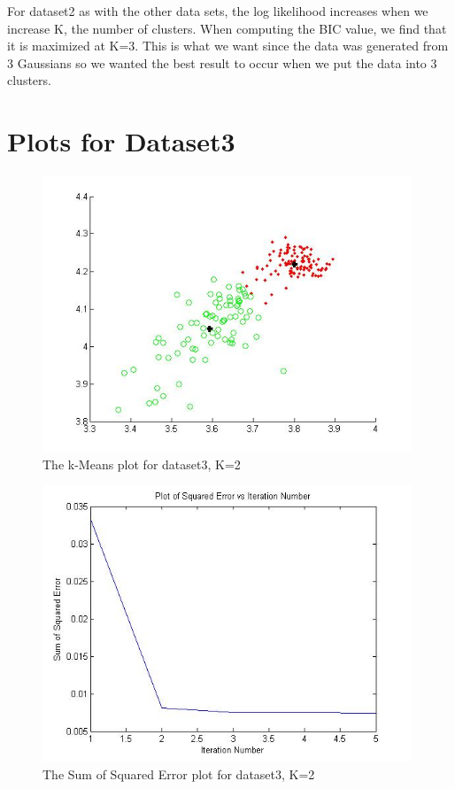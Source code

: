 \documentclass[11pt,psfig]{article}
\begin{document}
For dataset2 as with the other data sets, the log likelihood increases when we increase K, the number of clusters. When computing the BIC value, we find that it is maximized at K=3. This is what we want since the data was generated from 3 Gaussians so we wanted the best result to occur when we put the data into 3 clusters. 

\section{Plots for Dataset3}

\begin{figure}[H]
\centering
\includegraphics[height=3.25in]{dataset3_kMeansPlot.jpg}
\caption{The k-Means plot for dataset3, K=2}
\end{figure}

\begin{figure}[H]
\centering
\includegraphics[height=3.25in]{dataset3_kMeans_squaredErrorPlot.jpg}
\caption{The Sum of Squared Error plot for dataset3, K=2}
\end{figure}
\end{document}
